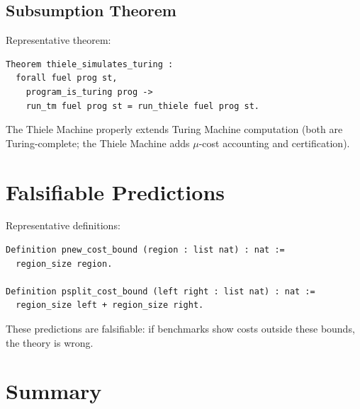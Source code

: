 \subsection{Subsumption Theorem}

Representative theorem:
\begin{lstlisting}
Theorem thiele_simulates_turing :
  forall fuel prog st,
    program_is_turing prog ->
    run_tm fuel prog st = run_thiele fuel prog st.
\end{lstlisting}

The Thiele Machine properly extends Turing Machine computation (both are Turing-complete; the Thiele Machine adds $\mu$-cost accounting and certification).

\section{Falsifiable Predictions}

Representative definitions:
\begin{lstlisting}
Definition pnew_cost_bound (region : list nat) : nat :=
  region_size region.

Definition psplit_cost_bound (left right : list nat) : nat :=
  region_size left + region_size right.
\end{lstlisting}

These predictions are falsifiable: if benchmarks show costs outside these bounds, the theory is wrong.

\section{Summary}


